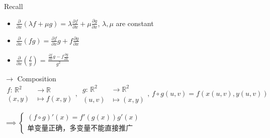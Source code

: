 Recall\begin{itemize}
    \item $\frac{\partial}{\partial x}(\lambda f+\mu g)=\lambda\frac{\partial f}{\partial x}+\mu\frac{\partial g}{\partial x}$, $\lambda,\mu$ are constant
    \item $\frac{\partial}{\partial x}(fg)=\frac{\partial f}{\partial x}g+f\frac{\partial g}{\partial x}$
    \item $\frac{\partial}{\partial x}\left(\frac{f}{g}\right)=\frac{\frac{\partial f}{\partial x}g-f\frac{\partial g}{\partial x}}{g^2}$
\end{itemize}
$\rightarrow$ Composition$$\begin{aligned}
        f:\,\mathbb{R}^2 & \to\mathbb{R}  \\
        (x,y)            & \mapsto f(x,y)
    \end{aligned},\,\begin{aligned}
        g:\,\mathbb{R}^2 & \to\mathbb{R}^2 \\
        (u,v)            & \mapsto(x,y)
    \end{aligned},\,f\circ g(u,v)=f(x(u,v),y(u,v))$$

$\implies\begin{cases}
        (f\circ g)'(x)=f'(g(x))g'(x) \\
        \text{单变量正确，多变量不能直接推广}
    \end{cases}$

